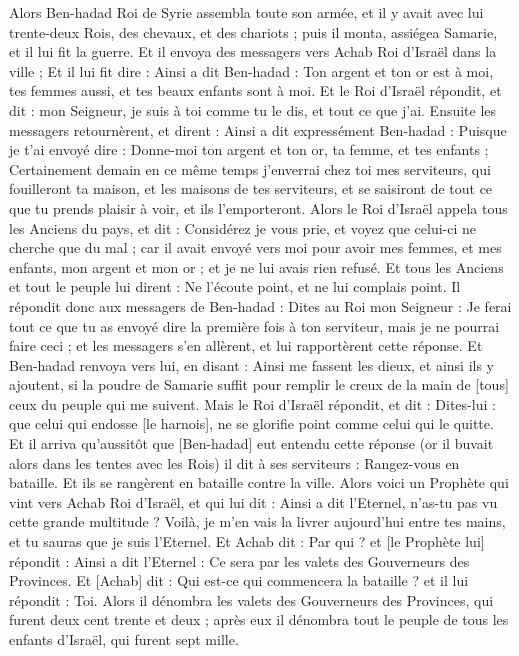 \begin{multicols}{2}
\VerseOne{}Alors Ben-hadad Roi de Syrie assembla toute son armée, et il y avait avec lui trente-deux Rois, des chevaux, et des chariots ; puis il monta, assiégea Samarie, et il lui fit la guerre.
Et il envoya des messagers vers Achab Roi d'Israël dans la ville ;
Et il lui fit dire : Ainsi a dit Ben-hadad : Ton argent et ton or est à moi, tes femmes aussi, et tes beaux enfants sont à moi.
Et le Roi d'Israël répondit, et dit : mon Seigneur, je suis à toi comme tu le dis, et tout ce que j'ai.
Ensuite les messagers retournèrent, et dirent : Ainsi a dit expressément Ben-hadad : Puisque je t'ai envoyé dire : Donne-moi ton argent et ton or, ta femme, et tes enfants ;
Certainement demain en ce même temps j'enverrai chez toi mes serviteurs, qui fouilleront ta maison, et les maisons de tes serviteurs, et se saisiront de tout ce que tu prends plaisir à voir, et ils l'emporteront.
Alors le Roi d'Israël appela tous les Anciens du pays, et dit : Considérez je vous prie, et voyez que celui-ci ne cherche que du mal ; car il avait envoyé vers moi pour avoir mes femmes, et mes enfants, mon argent et mon or ; et je ne lui avais rien refusé.
Et tous les Anciens et tout le peuple lui dirent : Ne l'écoute point, et ne lui complais point.
Il répondit donc aux messagers de Ben-hadad : Dites au Roi mon Seigneur : Je ferai tout ce que tu as envoyé dire la première fois à ton serviteur, mais je ne pourrai faire ceci ; et les messagers s'en allèrent, et lui rapportèrent cette réponse.
Et Ben-hadad renvoya vers lui, en disant : Ainsi me fassent les dieux, et ainsi ils y ajoutent, si la poudre de Samarie suffit pour remplir le creux de la main de [tous] ceux du peuple qui me suivent.
Mais le Roi d'Israël répondit, et dit : Dites-lui : que celui qui endosse [le harnois], ne se glorifie point comme celui qui le quitte.
Et il arriva qu'aussitôt que [Ben-hadad] eut entendu cette réponse (or il buvait alors dans les tentes avec les Rois) il dit à ses serviteurs : Rangez-vous en bataille. Et ils se rangèrent en bataille contre la ville.
Alors voici un Prophète qui vint vers Achab Roi d'Israël, et qui lui dit : Ainsi a dit l'Eternel, n'as-tu pas vu cette grande multitude ? Voilà, je m'en vais la livrer aujourd'hui entre tes mains, et tu sauras que je suis l'Eternel.
Et Achab dit : Par qui ? et [le Prophète lui] répondit : Ainsi a dit l'Eternel : Ce sera par les valets des Gouverneurs des Provinces. Et [Achab] dit : Qui est-ce qui commencera la bataille ? et il lui répondit : Toi.
Alors il dénombra les valets des Gouverneurs des Provinces, qui furent deux cent trente et deux ; après eux il dénombra tout le peuple de tous les enfants d'Israël, qui furent sept mille.

\end{multicols}
